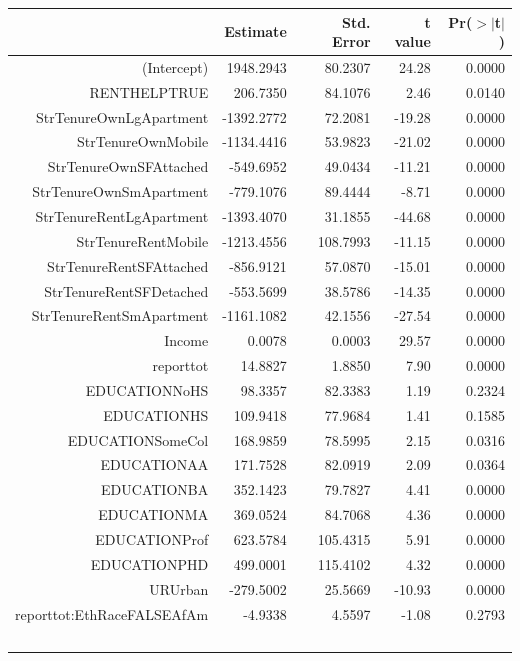\documentclass{article}
\begin{document}
\begin{table}[ht]
\centering
\begin{tabular}{rrrrr}
  \hline
 & Estimate & Std. Error & t value & Pr($>$$|$t$|$) \\ 
  \hline
(Intercept) & 1948.2943 & 80.2307 & 24.28 & 0.0000 \\ 
  RENTHELPTRUE & 206.7350 & 84.1076 & 2.46 & 0.0140 \\ 
  StrTenureOwnLgApartment & -1392.2772 & 72.2081 & -19.28 & 0.0000 \\ 
  StrTenureOwnMobile & -1134.4416 & 53.9823 & -21.02 & 0.0000 \\ 
  StrTenureOwnSFAttached & -549.6952 & 49.0434 & -11.21 & 0.0000 \\ 
  StrTenureOwnSmApartment & -779.1076 & 89.4444 & -8.71 & 0.0000 \\ 
  StrTenureRentLgApartment & -1393.4070 & 31.1855 & -44.68 & 0.0000 \\ 
  StrTenureRentMobile & -1213.4556 & 108.7993 & -11.15 & 0.0000 \\ 
  StrTenureRentSFAttached & -856.9121 & 57.0870 & -15.01 & 0.0000 \\ 
  StrTenureRentSFDetached & -553.5699 & 38.5786 & -14.35 & 0.0000 \\ 
  StrTenureRentSmApartment & -1161.1082 & 42.1556 & -27.54 & 0.0000 \\ 
  Income & 0.0078 & 0.0003 & 29.57 & 0.0000 \\ 
  reporttot & 14.8827 & 1.8850 & 7.90 & 0.0000 \\ 
  EDUCATIONNoHS & 98.3357 & 82.3383 & 1.19 & 0.2324 \\ 
  EDUCATIONHS & 109.9418 & 77.9684 & 1.41 & 0.1585 \\ 
  EDUCATIONSomeCol & 168.9859 & 78.5995 & 2.15 & 0.0316 \\ 
  EDUCATIONAA & 171.7528 & 82.0919 & 2.09 & 0.0364 \\ 
  EDUCATIONBA & 352.1423 & 79.7827 & 4.41 & 0.0000 \\ 
  EDUCATIONMA & 369.0524 & 84.7068 & 4.36 & 0.0000 \\ 
  EDUCATIONProf & 623.5784 & 105.4315 & 5.91 & 0.0000 \\ 
  EDUCATIONPHD & 499.0001 & 115.4102 & 4.32 & 0.0000 \\ 
  URUrban & -279.5002 & 25.5669 & -10.93 & 0.0000 \\ 
  reporttot:EthRaceFALSEAfAm & -4.9338 & 4.5597 & -1.08 & 0.2793 \\ 
$$
\end{tabular}
\end{table}
\end{document}
